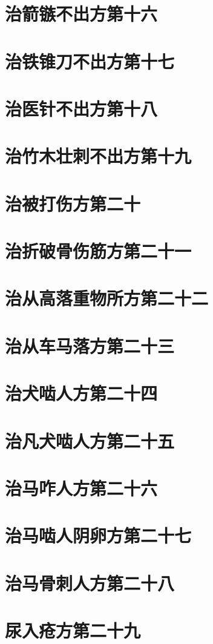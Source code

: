 \documentclass[a4paper,12pt,UTF8,twoside]{ctexbook}
\begin{document}
\chapter{治箭镞不出方第十六}
\chapter{治铁锥刀不出方第十七}
\chapter{治医针不出方第十八}
\chapter{治竹木壮刺不出方第十九}
\chapter{治被打伤方第二十}
\chapter{治折破骨伤筋方第二十一}
\chapter{治从高落重物所方第二十二}
\chapter{治从车马落方第二十三}
\chapter{治犬啮人方第二十四}
\chapter{治凡犬啮人方第二十五}
\chapter{治马咋人方第二十六}
\chapter{治马啮人阴卵方第二十七}
\chapter{治马骨刺人方第二十八}
\chapter{尿入疮方第二十九}
\end{document}
